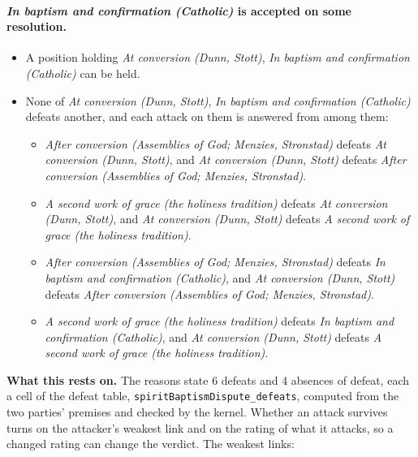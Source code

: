 \documentclass[11pt]{article}
\begin{document}
\paragraph{\emph{In baptism and confirmation (Catholic)} is accepted on some resolution.}
\begin{itemize}
\item A position holding \emph{At conversion (Dunn, Stott)}, \emph{In baptism and confirmation (Catholic)} can be held.
\item None of \emph{At conversion (Dunn, Stott)}, \emph{In baptism and confirmation (Catholic)} defeats another, and each attack on them is answered from among them:
\begin{itemize}
\item \emph{After conversion (Assemblies of God; Menzies, Stronstad)} defeats \emph{At conversion (Dunn, Stott)}, and \emph{At conversion (Dunn, Stott)} defeats \emph{After conversion (Assemblies of God; Menzies, Stronstad)}.
\item \emph{A second work of grace (the holiness tradition)} defeats \emph{At conversion (Dunn, Stott)}, and \emph{At conversion (Dunn, Stott)} defeats \emph{A second work of grace (the holiness tradition)}.
\item \emph{After conversion (Assemblies of God; Menzies, Stronstad)} defeats \emph{In baptism and confirmation (Catholic)}, and \emph{At conversion (Dunn, Stott)} defeats \emph{After conversion (Assemblies of God; Menzies, Stronstad)}.
\item \emph{A second work of grace (the holiness tradition)} defeats \emph{In baptism and confirmation (Catholic)}, and \emph{At conversion (Dunn, Stott)} defeats \emph{A second work of grace (the holiness tradition)}.
\end{itemize}
\end{itemize}
\par\noindent\textbf{What this rests on.} The reasons state 6 defeats and 4 absences of defeat, each a cell of the defeat table, \texttt{spirit\allowbreak{}Baptism\allowbreak{}Dispute\_\allowbreak{}defeats}, computed from the two parties' premises and checked by the kernel. Whether an attack survives turns on the attacker's weakest link and on the rating of what it attacks, so a changed rating can change the verdict. The weakest links:
\end{document}
